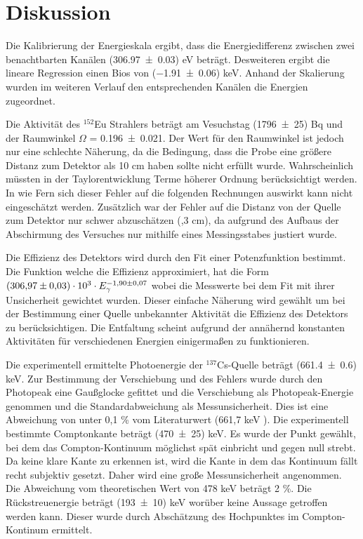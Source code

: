 \section{Diskussion}
\label{sec:Diskussion}
Die Kalibrierung der Energieskala ergibt, dass die Energiedifferenz zwischen zwei benachtbarten Kanälen (\num{306,97 +- 0,03}) eV beträgt. Desweiteren ergibt die lineare Regression einen Bios von (\num{-1,91 +- 0.06}) keV. Anhand der Skalierung wurden im weiteren Verlauf den entsprechenden Kanälen die Energien zugeordnet.

Die Aktivität des $^{152}$Eu Strahlers beträgt am Vesuchstag (\num{1796 +- 25}) Bq und der Raumwinkel $\Omega$ = \num{0,196 +- 0,021}. Der Wert für den Raumwinkel ist jedoch nur eine schlechte Näherung, da die Bedingung, dass die Probe eine größere Distanz zum Detektor als 10 cm haben sollte nicht erfüllt wurde. Wahrscheinlich müssten in der Taylorentwicklung Terme höherer Ordnung berücksichtigt werden. In wie Fern sich dieser Fehler auf die folgenden Rechnungen auswirkt kann nicht eingeschätzt werden. Zusätzlich war der Fehler auf die Distanz von der Quelle zum Detektor nur schwer abzuschätzen (,3 cm), da aufgrund des Aufbaus der Abschirmung des Versuches nur mithilfe eines Messingsstabes justiert wurde.

Die Effizienz des Detektors wird durch den Fit einer Potenzfunktion bestimmt. Die Funktion welche die Effizienz approximiert, hat die Form $(\num{306,97 +- 0,03}) \cdot 10^3 \cdot E_\gamma^{\num{-1,90 +- 0,07}}$ wobei die Messwerte bei dem Fit mit ihrer Unsicherheit gewichtet wurden. Dieser einfache Näherung wird gewählt um bei der Bestimmung einer Quelle unbekannter Aktivität die Effizienz des Detektors zu berücksichtigen. Die Entfaltung scheint aufgrund der annähernd konstanten Aktivitäten für verschiedenen Energien einigermaßen zu funktionieren.

Die experimentell ermittelte Photoenergie der $^{137}$Cs-Quelle beträgt (\num{661,4 +- 0,6}) keV. Zur Bestimmung der Verschiebung und des Fehlers wurde durch den Photopeak eine Gaußglocke gefittet und die Verschiebung als Photopeak-Energie genommen und die Standardabweichung als Messunsicherheit. Dies ist eine Abweichung von unter 0,1 \% vom Literaturwert (661,7 keV \cite{Cs}). Die experimentell bestimmte Comptonkante beträgt (\num{470+- 25}) keV. Es wurde der Punkt gewählt, bei dem das Compton-Kontinuum möglichst spät einbricht und gegen null strebt. Da keine klare Kante zu erkennen ist, wird die Kante in dem das Kontinuum fällt recht subjektiv gesetzt. Daher wird eine große Messunsicherheit angenommen. Die Abweichung vom theoretischen Wert von 478 keV beträgt 2 \%. Die Rückstreuenergie beträgt (\num{193+- 10}) keV worüber keine Aussage getroffen werden kann. Dieser wurde durch Abschätzung des Hochpunktes im Compton-Kontinum ermittelt.

